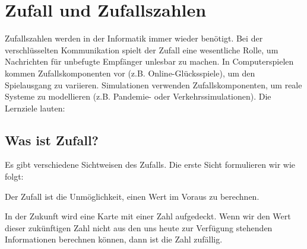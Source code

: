 
\toggletrue{image}
\toggletrue{imagehover}

\chapter{Zufall und Zufallszahlen}
\label{ch:zufall-und-zufallszahlen}

Zufallszahlen werden in der Informatik immer wieder benötigt. Bei der verschlüsselten Kommunikation spielt der Zufall eine wesentliche Rolle, um Nachrichten für unbefugte Empfänger unlesbar zu machen. In Computerspielen kommen Zufallskomponenten vor (z.B. Online-Glücksspiele), um den Spielausgang zu variieren. Simulationen verwenden Zufallskomponenten, um reale Systeme zu modellieren (z.B. Pandemie- oder Verkehrssimulationen). Die Lernziele lauten:\\


\section{Was ist Zufall?}

Es gibt verschiedene Sichtweisen des Zufalls. Die erste Sicht formulieren wir wie folgt:

\begin{definition}
Der Zufall ist die Unmöglichkeit, einen Wert im Voraus zu berechnen.
\end{definition}

\begin{example}
In der Zukunft wird eine Karte mit einer Zahl aufgedeckt. Wenn wir den Wert dieser zukünftigen Zahl nicht aus den uns heute zur Verfügung stehenden Informationen berechnen können, dann ist die Zahl zufällig.
\end{example}

